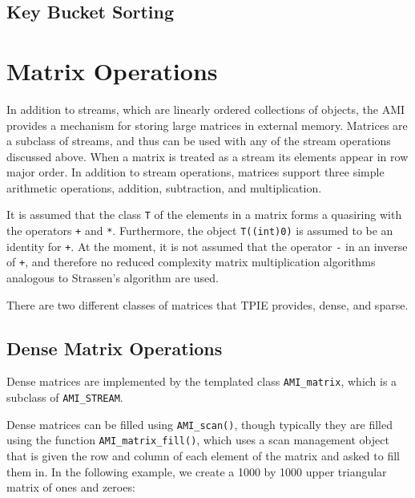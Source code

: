 
\subsection{Key Bucket Sorting}
\label{sec:kb-sorting}


\section{Matrix Operations}
\label{sec:matrix}


In addition to streams, which are linearly ordered collections of
objects, the AMI provides a mechanism for storing large matrices in
external memory.  Matrices are a subclass of streams, and thus can be
used with any of the stream operations discussed above.  When a matrix
is treated as a stream its elements appear in row major order.  In
addition to stream operations, matrices support three simple
arithmetic operations, addition, subtraction, and multiplication.

It is assumed that the class \verb|T| of the elements in a matrix
forms a quasiring with the operators \verb|+| and \verb|*|.
Furthermore, the object \verb|T((int)0)| is assumed to be an identity
for \verb|+|.  At the moment, it is not assumed that the operator
\verb|-| in an inverse of \verb|+|, and therefore no reduced
complexity matrix multiplication algorithms analogous to Strassen's
algorithm are used.

There are two different classes of matrices that TPIE provides, dense,
and sparse.

\subsection{Dense Matrix Operations}
\label{sec:dense-mat}


Dense matrices are implemented by the templated class
\verb|AMI_matrix|,
 which is a subclass of
\verb|AMI_STREAM|.

Dense matrices can be filled using \verb|AMI_scan()|, though typically
they are filled using the function \verb|AMI_matrix_fill()|, which
uses a scan management object that is given the row and column of each
element of the matrix and asked to fill them in.  In the following
example, we create a 1000 by 1000 upper triangular matrix of ones and
zeroes:

